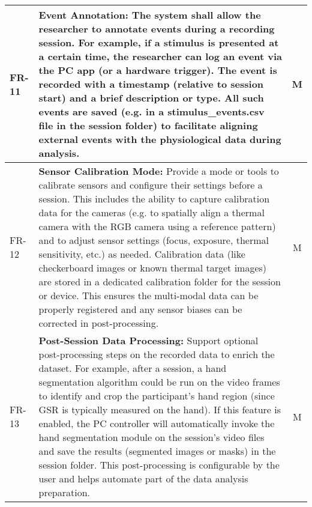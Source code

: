\begin{table}[htbp]
\begin{tabular}{|p{1cm}|p{10cm}|c|}
\hline
FR-11 & \textbf{Event Annotation:} The system shall allow the researcher to annotate events during a recording session. For example, if a stimulus is presented at a certain time, the researcher can log an event via the PC app (or a hardware trigger). The event is recorded with a timestamp (relative to session start) and a brief description or type. All such events are saved (e.g. in a stimulus\_events.csv file in the session folder) to facilitate aligning external events with the physiological data during analysis. & M \\
\hline
FR-12 & \textbf{Sensor Calibration Mode:} Provide a mode or tools to calibrate sensors and configure their settings before a session. This includes the ability to capture calibration data for the cameras (e.g. to spatially align a thermal camera with the RGB camera using a reference pattern) and to adjust sensor settings (focus, exposure, thermal sensitivity, etc.) as needed. Calibration data (like checkerboard images or known thermal target images) are stored in a dedicated calibration folder for the session or device. This ensures the multi-modal data can be properly registered and any sensor biases can be corrected in post-processing. & M \\
\hline
FR-13 & \textbf{Post-Session Data Processing:} Support optional post-processing steps on the recorded data to enrich the dataset. For example, after a session, a hand segmentation algorithm could be run on the video frames to identify and crop the participant's hand region (since GSR is typically measured on the hand). If this feature is enabled, the PC controller will automatically invoke the hand segmentation module on the session's video files and save the results (segmented images or masks) in the session folder. This post-processing is configurable by the user and helps automate part of the data analysis preparation. & M \\
\hline
\end{tabular}
\end{table}

